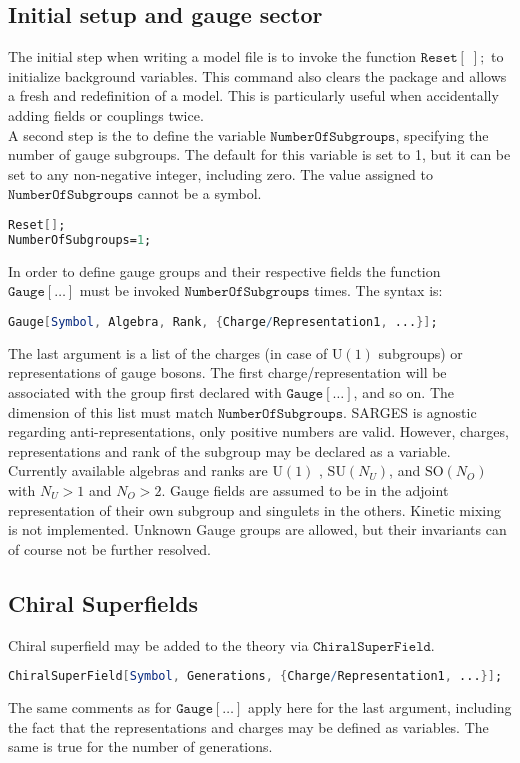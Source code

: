 \documentclass{scrartcl}
\begin{document}
\subsection{Initial setup and gauge sector}
The initial step when writing a model file is to invoke the function $\mathtt{Reset[\;];}$ to initialize background variables. This command also clears the package and allows a fresh and redefinition of a model. This is particularly useful when accidentally adding fields or couplings twice. \\
A second step is the to define the variable $\mathtt{NumberOfSubgroups}$, specifying the number of gauge subgroups. The default for this variable is set to 1, but it can be set to any non-negative integer, including zero. The value assigned to $\mathtt{NumberOfSubgroups}$ cannot be a symbol.
\vspace{1em}
\begin{lstlisting}[language=mathematica,mathescape,columns=flexible,backgroundcolor=\color{light-gray}]
Reset[];
NumberOfSubgroups=1;
\end{lstlisting}
\vspace{1em}
In order to define gauge groups and their respective fields the function $\mathtt{Gauge[\dots]}$ must be invoked $\mathtt{NumberOfSubgroups}$ times. The syntax is:
\begin{lstlisting}[language=mathematica,mathescape,columns=flexible,backgroundcolor=\color{light-gray}]
Gauge[Symbol, Algebra, Rank, {Charge/Representation1, ...}];
\end{lstlisting}
The last argument is a list of the charges (in case of $\mathrm{U}(1)$ subgroups) or representations of gauge bosons. The first charge/representation will be associated with the group first declared with $\mathtt{Gauge[\dots]}$, and so on. The dimension of this list must match $\mathtt{NumberOfSubgroups}$. SARGES is agnostic regarding anti-representations, only positive numbers are valid. However, charges, representations and rank of the subgroup may be declared as a variable. \newline Currently available algebras and ranks are $\mathrm{U}(1)$ , $\mathrm{SU}(N_U)$, and $\mathrm{SO}(N_O)$ with $N_U > 1$ and $N_O > 2$. Gauge fields are assumed to be in the adjoint representation of their own subgroup and singulets in the others. Kinetic mixing is not implemented. \newline Unknown Gauge groups are allowed, but their invariants can of course not be further resolved.
\FloatBarrier
\subsection{Chiral Superfields}
Chiral superfield may be added to the theory via $\mathtt{ChiralSuperField}$.
\begin{lstlisting}[language=mathematica,mathescape,columns=flexible,backgroundcolor=\color{light-gray}]
ChiralSuperField[Symbol, Generations, {Charge/Representation1, ...}];
\end{lstlisting}
The same comments as for $\mathtt{Gauge[\dots]}$ apply here for the last argument, including the fact that the representations and charges may be defined as variables. The same is true for the number of generations.
\FloatBarrier
\end{document}

